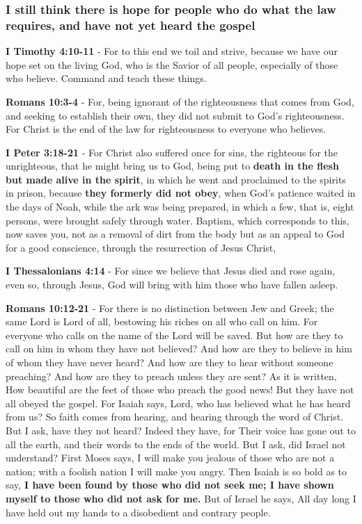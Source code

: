 \documentclass[11pt]{article}
\begin{document}
\subsubsection{I still think there is hope for people who do what the law requires, and have not yet heard the gospel}
\label{sec:org3ea0ee2}
\textbf{I Timothy 4:10-11} - For to this end we toil and strive, because we have our hope set on the living God, who is the Savior of all people, especially of those who believe. Command and teach these things.

\textbf{Romans 10:3-4} - For, being ignorant of the righteousness that comes from God, and seeking to establish their own, they did not submit to God's righteousness. For Christ is the end of the law for righteousness to everyone who believes.

\textbf{I Peter 3:18-21} - For Christ also suffered once for sins, the righteous for the unrighteous, that he might bring us to God, being put to \textbf{death in the flesh but made alive in the spirit}, in which he went and proclaimed to the spirits in prison, because \textbf{they formerly did not obey}, when God's patience waited in the days of Noah, while the ark was being prepared, in which a few, that is, eight persons, were brought safely through water. Baptism, which corresponds to this, now saves you, not as a removal of dirt from the body but as an appeal to God for a good conscience, through the resurrection of Jesus Christ,

\textbf{I Thessalonians 4:14} - For since we believe that Jesus died and rose again, even so, through Jesus, God will bring with him those who have fallen asleep.

\textbf{Romans 10:12-21} - For there is no distinction between Jew and Greek; the same Lord is Lord of all, bestowing his riches on all who call on him.  For everyone who calls on the name of the Lord will be saved.  But how are they to call on him in whom they have not believed? And how are they to believe in him of whom they have never heard? And how are they to hear without someone preaching?  And how are they to preach unless they are sent? As it is written, How beautiful are the feet of those who preach the good news!  But they have not all obeyed the gospel. For Isaiah says, Lord, who has believed what he has heard from us?  So faith comes from hearing, and hearing through the word of Christ.  But I ask, have they not heard? Indeed they have, for Their voice has gone out to all the earth, and their words to the ends of the world.  But I ask, did Israel not understand? First Moses says, I will make you jealous of those who are not a nation; with a foolish nation I will make you angry.  Then Isaiah is so bold as to say, \textbf{I have been found by those who did not seek me; I have shown myself to those who did not ask for me.} But of Israel he says, All day long I have held out my hands to a disobedient and contrary people.
\end{document}
